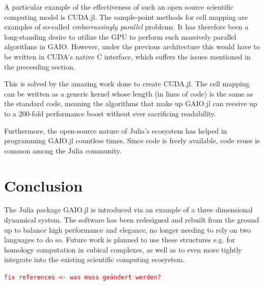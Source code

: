 \documentclass{juliacon}
\newcommand{\todo}[1]{\textcolor{red}{\texttt{#1}}}
\begin{document}
A particular example of the effectiveness of such an open source scientific computing model is CUDA.jl. The sample-point methods for cell mapping are examples of so-called \emph{embarrassingly parallel} \cite{parallel} problems. It has therefore been a long-standing desire to utilize the GPU to perform such massively parallel algorithms in GAIO. However, under the previous architecture this would have to be written in CUDA's native C interface, which suffers the issues mentioned in the preceeding section. 

This is solved by the amazing work done to create CUDA.jl. The cell mapping can be written as a generic kernel whose length (in lines of code) is the same as the standard code, meaning the algorithms that make up GAIO.jl can receive up to a 200-fold \cite{gaiocuda} performance boost without ever sacrificing readability. 

Furthermore, the open-source nature of Julia's ecosystem has helped in programming GAIO.jl countless times. Since code is freely available, code reuse is common among the Julia community.

\section{Conclusion}

The Julia package GAIO.jl is introduced via an example of a three dimensional dynamical system. The software has been redesigned and rebuilt from the ground up to balance high performance and elegance, no longer needing to rely on two languages to do so. Future work is planned to use these structures e.g. for homology computation in cubical complexes, as well as to even more tightly integrate into the existing scientific computing ecosystem.

\todo{fix references <- was muss geändert werden?}


\end{document}
